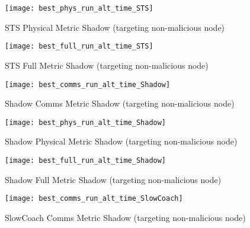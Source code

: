 \documentclass[aspectratio=43]{beamer}
\begin{document}
\begin{frame}\begin{figure}[h]
	\centering
	\texttt{[image: best\_phys\_run\_alt\_time\_STS]}
	\caption{STS Physical Metric Shadow (targeting non-malicious node)}
	\label{fig:phys_alt_time_sts}
\end{figure}\end{frame}

\begin{frame}\begin{figure}[h]
	\centering
	\texttt{[image: best\_full\_run\_alt\_time\_STS]}
	\caption{STS Full Metric Shadow (targeting non-malicious node)}
	\label{fig:full_alt_time_sts}
\end{figure}\end{frame}



\begin{frame}\begin{figure}[h]
	\centering
	\texttt{[image: best\_comms\_run\_alt\_time\_Shadow]}
	\caption{Shadow Comms Metric Shadow (targeting non-malicious node)}
	\label{fig:comms_alt_time_shadow}
\end{figure}\end{frame}

\begin{frame}\begin{figure}[h]
	\centering
	\texttt{[image: best\_phys\_run\_alt\_time\_Shadow]}
	\caption{Shadow Physical Metric Shadow (targeting non-malicious node)}
	\label{fig:phys_alt_time_shadow}
\end{figure}\end{frame}

\begin{frame}\begin{figure}[h]
	\centering
	\texttt{[image: best\_full\_run\_alt\_time\_Shadow]}
	\caption{Shadow Full Metric Shadow (targeting non-malicious node)}
	\label{fig:full_alt_time_shadow}
\end{figure}\end{frame}



\begin{frame}\begin{figure}[h]
	\centering
	\texttt{[image: best\_comms\_run\_alt\_time\_SlowCoach]}
	\caption{SlowCoach Comms Metric Shadow (targeting non-malicious node)}
	\label{fig:comms_alt_time_slowcoach}
\end{figure}\end{frame}
\end{document}
